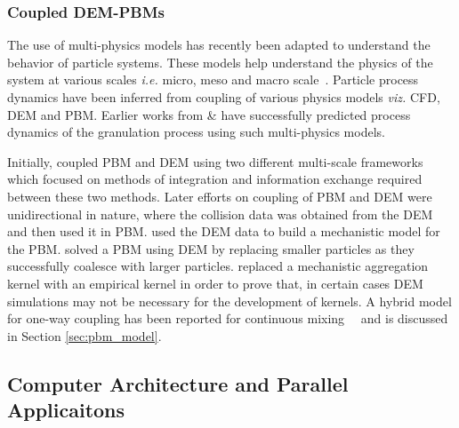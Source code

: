 \documentclass[preprint,11pt,authoryear]{elsarticle}
\newcommand{\gpnote}[1]{{\textcolor{green} {***giannis: #1}}}
\newcommand{\fbnote}[1]{{\textcolor{cyan} { ***franklin: #1 }}}
\newcommand{\gpnote}[1]{}
\begin{document}
\subsubsection{Coupled DEM-PBMs}
The use of multi-physics models has recently been adapted to understand the behavior of 
particle systems. These models help understand the physics of the system at various scales 
\textit{i.e.} micro, meso and macro scale~\citep{sen2014}. Particle process dynamics have been 
inferred from coupling of various physics models \textit{viz.} CFD, 
DEM and PBM. Earlier works from \cite{sen2014} \& \cite{Barrasso2015cerd} have successfully 
predicted process dynamics of the granulation process using such multi-physics models.

Initially, \cite{ingram2004} coupled PBM and DEM using two different multi-scale frameworks which 
focused on methods of integration and information exchange required between these two methods. 
Later efforts on coupling of PBM and DEM were unidirectional in nature, where the collision 
data was obtained from the DEM and then used it in PBM. \cite{gantt2006} used the DEM data 
to build a mechanistic model for the PBM. \cite{Goldschmidt2003} solved a PBM using DEM by 
replacing smaller particles as they successfully coalesce with larger particles. 
\cite{Reinhold2012} replaced a mechanistic aggregation kernel with an empirical kernel 
in order to prove that, in certain cases DEM simulations may not be necessary for the 
development of kernels. A hybrid model for one-way coupling has been reported for continuous 
mixing~\citep{sen2013}~\citep{sen2013b} and is discussed in Section \ref{sec:pbm_model}.
%
% 

\subsection{Computer Architecture and Parallel Applicaitons}

\end{document}
